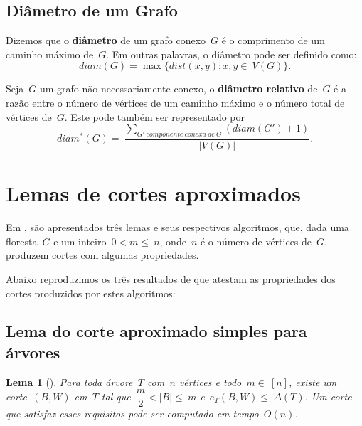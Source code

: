 \documentclass[a4paper,12pt]{article}
\newtheorem{lem}{Lema}
\begin{document}
	\bigskip
	\bigskip


	\subsection{Diâmetro de um Grafo}

	Dizemos que o \textbf{diâmetro} de um grafo conexo~$G$ é o
	comprimento de um caminho máximo de~$G$. 
	Em outras palavras, o diâmetro pode ser definido como:
	$$ diam(G)=\max\{dist(x,y):x,y\in~V(G)\}.$$

	\bigskip

	Seja~$G$ um grafo não necessariamente conexo,
	o \textbf{diâmetro relativo} de~$G$
	 é a razão entre o número
	de vértices de um caminho máximo e o número total de vértices
	de~$G$. Este pode também ser representado por
	$$ diam^*(G) =~\dfrac{\displaystyle\sum_{
	G'~componente~conexa~de~G}^{}(diam(G')+1)}{|V(G)|}.$$
    
\newpage
\section {Lemas de cortes aproximados}

Em \cite{Schmidt15}, são apresentados três lemas e seus
respectivos algoritmos, que, dada uma 
floresta~$G$ e um inteiro~$0<m\le~n$, onde~$n$ é o número de vértices 
de~$G$, produzem cortes com algumas propriedades.

Abaixo reproduzimos os três resultados de \cite{Schmidt15} que 
atestam as propriedades dos cortes produzidos por estes algoritmos:

\bigskip
\bigskip
\bigskip

\subsection{Lema do corte aproximado simples para árvores}
\begin{lem}[]
\label{lema:simpleApproxCutTree}
	Para toda árvore~$T$ com~$n$ vértices e todo~$m \in~[n]$,
	existe um corte~$(B,W)$ em~$T$ tal 
	que~$\dfrac{m}{2} <|B| \le~m$ e~$e_T(B,W) \le~\Delta(T)$.
	Um corte que satisfaz esses requisitos pode ser computado em
	tempo~$O(n)$.
\end{lem}
\end{document}
